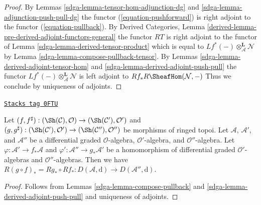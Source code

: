 \begin{proof}

By Lemmas \ref{sdga-lemma-tensor-hom-adjunction-dg} and
\ref{sdga-lemma-adjunction-push-pull-dg} the functor
(\ref{equation-pushforward}) is right adjoint to
the functor (\ref{equation-pullback}). By Derived Categories, Lemma
\ref{derived-lemma-pre-derived-adjoint-functors-general}
the functor $RT$ is right adjoint to the functor
of Lemma \ref{sdga-lemma-derived-tensor-product} which is equal to
$Lf^*(-) \otimes_\mathcal{A}^\mathbf{L} \mathcal{N}$ by
Lemma \ref{sdga-lemma-compose-pullback-tensor}.
By Lemmas \ref{sdga-lemma-derived-adjoint-tensor-hom} and
\ref{sdga-lemma-derived-adjoint-push-pull} the functor
$Lf^*(-) \otimes_\mathcal{A}^\mathbf{L} \mathcal{N}$
is left adjoint to
$Rf_* R\SheafHom(\mathcal{N}, -)$
Thus we conclude by uniqueness of adjoints.
\end{proof}

\begin{lemma}
\label{sdga-lemma-compose-pushforward}
\href{https://stacks.math.columbia.edu/tag/0FTU}{\texttt{Stacks tag 0FTU}}

Let $(f, f^\sharp) : (\Sh(\mathcal{C}), \mathcal{O})
\to (\Sh(\mathcal{C}'), \mathcal{O}')$ and
$(g, g^\sharp) : (\Sh(\mathcal{C}'), \mathcal{O}')
\to (\Sh(\mathcal{C}''), \mathcal{O}'')$
be morphisms of ringed topoi. Let $\mathcal{A}$, $\mathcal{A}'$, and
$\mathcal{A}''$ be a differential graded $\mathcal{O}$-algebra,
$\mathcal{O}'$-algebra, and $\mathcal{O}''$-algebra. Let
$\varphi : \mathcal{A}' \to f_*\mathcal{A}$ and
$\varphi' : \mathcal{A}'' \to g_*\mathcal{A}'$
be a homomorphism of differential graded $\mathcal{O}'$-algebras
and $\mathcal{O}''$-algebras.
Then we have $R(g \circ f)_* = Rg_* \circ Rf_* :
D(\mathcal{A}, \text{d}) \to D(\mathcal{A}'', \text{d})$.
\end{lemma}

\begin{proof}

Follows from Lemmas \ref{sdga-lemma-compose-pullback} and
\ref{sdga-lemma-derived-adjoint-push-pull}
and uniqueness of adjoints.
\end{proof}

